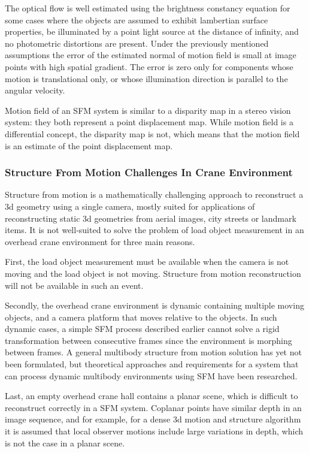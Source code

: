 \documentclass[12pt,a4paper,oneside,pdftex]{report}
\begin{document}
{The optical flow is well estimated using the brightness constancy equation for some cases where the objects are assumed to exhibit lambertian surface properties, be illuminated by a point light source at the distance of infinity, and  no photometric distortions are present. Under the previously mentioned assumptions the error of the estimated normal of motion field is small at image points with high spatial gradient. The error is zero only for components whose motion is translational only, or whose illumination direction is parallel to the angular velocity. 

Motion field of an SFM system is similar to a disparity map in a stereo vision system: they both represent a point displacement map. While motion field is a differential concept, the disparity map is not, which means that the motion field is an estimate of the point displacement map.

\subsubsection{Structure From Motion Challenges In Crane Environment}
\label{subsubsection:structure_from_motion_challenges_in_crane_environment}

Structure from motion is a mathematically challenging approach to reconstruct a 3d geometry using a single camera, mostly suited for applications of reconstructing static 3d geometries from aerial images, city streets or landmark items. It is not well-suited to solve the problem of load object measurement in an overhead crane environment for three main reasons.

First, the load object measurement must be available when the camera is not moving and the load object is not moving. Structure from motion reconstruction will not be available in such an event. 

Secondly, the overhead crane environment is dynamic containing multiple moving objects, and a camera platform that moves relative to the objects. In such dynamic cases, a simple SFM process described earlier cannot solve a rigid transformation between consecutive frames since the environment is morphing between frames. A general multibody structure from motion solution has yet not been formulated, but theoretical approaches and requirements for a system that can process dynamic multibody environments using SFM have been researched\citep{Ozden10}.

Last, an empty overhead crane hall contains a planar scene, which is difficult to reconstruct correctly in a SFM system. Coplanar points have similar depth in an image sequence, and for example, for a dense 3d motion and structure algorithm it is assumed that local observer motions include large variations in depth, which is not the case in a planar scene\citep{Trucco98}.

}
\end{document}

